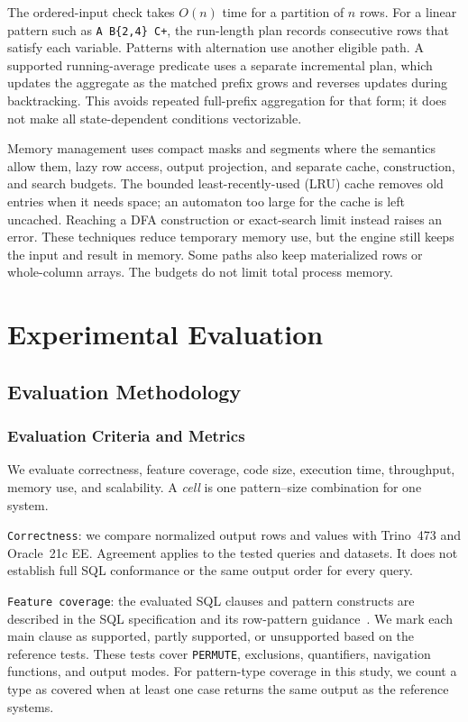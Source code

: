 \documentclass[preprint,12pt,times,a4paper]{elsarticle}
\begin{document}
The ordered-input check takes $O(n)$ time for a partition of $n$ rows.
For a linear pattern such as \texttt{A B\{2,4\} C+}, the run-length plan
records consecutive rows that satisfy each variable. Patterns with alternation
use another eligible path. A supported running-average predicate uses a
separate incremental plan, which updates the aggregate as the matched prefix
grows and reverses updates during backtracking. This avoids repeated
full-prefix aggregation for that form; it does not make all state-dependent
conditions vectorizable.

Memory management uses compact masks and segments where the semantics allow
them, lazy row access, output projection, and separate cache, construction,
and search budgets. The bounded least-recently-used (LRU) cache removes old
entries when it needs space; an automaton too large for the cache is left
uncached. Reaching a DFA construction or exact-search limit instead raises
an error. These techniques reduce temporary memory use, but the engine still
keeps the input and result in memory. Some paths also keep materialized rows
or whole-column arrays. The budgets do not limit total process memory.


\FloatBarrier
\section{Experimental Evaluation}

\subsection{Evaluation Methodology}

\subsubsection{Evaluation Criteria and Metrics}

We evaluate correctness, feature coverage, code size, execution time,
throughput, memory use, and scalability. A \emph{cell} is one pattern--size
combination for one system.

\texttt{Correctness}: we compare normalized output rows and values with
Trino~473 and Oracle~21c EE. Agreement applies to the tested queries and
datasets. It does not establish full SQL conformance or the same output order
for every query.

\texttt{Feature coverage}: the evaluated SQL clauses and pattern constructs
are described in the SQL specification and its row-pattern
guidance~\cite{iso9075_2_2016,ISO2021}. We mark each main clause as supported,
partly supported, or unsupported based on the reference tests. These tests cover
\texttt{PERMUTE}, exclusions, quantifiers, navigation functions, and output
modes. For pattern-type coverage in this study, we count a type as covered
when at least one case returns the same output as the reference systems.
\end{document}
